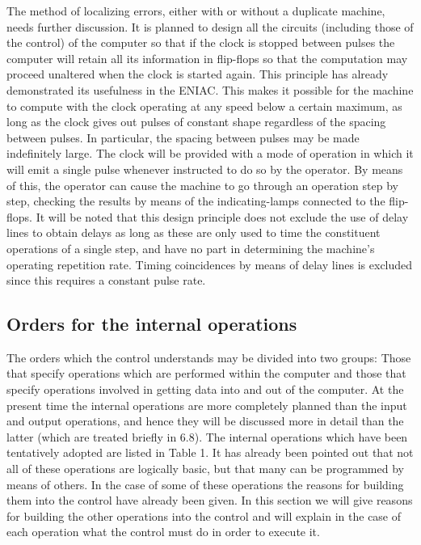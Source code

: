 \documentclass[12pt]{amsart}
\begin{document}
The method of localizing errors, either with or without a duplicate machine, needs further discussion. It is planned to design all the circuits (including those of the control) of the computer so that if the clock is stopped between pulses the computer will retain all its information in flip-flops so that the computation may proceed unaltered when the clock is started again. This principle has already demonstrated its usefulness in the ENIAC. This makes it possible for the machine to compute with the clock operating at any speed below a certain maximum, as long as the clock gives out pulses of constant shape regardless of the spacing between pulses. In particular, the spacing between pulses may be made indefinitely large. The clock will be provided with a mode of operation in which it will emit a single pulse whenever instructed to do so by the operator. By means of this, the operator can cause the machine to go through an operation step by step, checking the results by means of the indicating-lamps connected to the flip-flops. It will be noted that this design principle does not exclude the use of delay lines to obtain delays as long as these are only used to time the constituent operations of a single step, and have no part in determining the machine's operating repetition rate. Timing coincidences by means of delay lines is excluded since this requires a constant pulse rate.

\subsection{Orders for the internal operations}
The orders which the control understands may be divided into two groups: Those that specify operations which are performed within the computer and those that specify operations involved in getting data into and out of the computer. At the present time the internal operations are more completely planned than the input and output operations, and hence they will be discussed more in detail than the latter (which are treated briefly in 6.8). The internal operations which have been tentatively adopted are listed in Table 1. It has already been pointed out that not all of these operations are logically basic, but that many can be programmed by means of others. In the case of some of these operations the reasons for building them into the control have already been given. In this section we will give reasons for building the other operations into the control and will explain in the case of each operation what the control must do in order to execute it.
\end{document}
